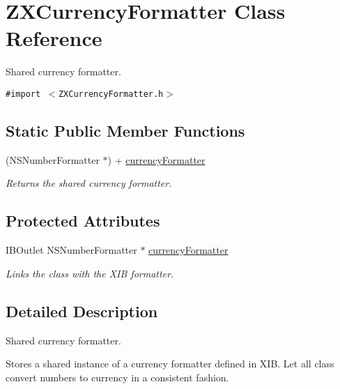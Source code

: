 \hypertarget{interface_z_x_currency_formatter}{
\section{ZXCurrencyFormatter Class Reference}
\label{interface_z_x_currency_formatter}
}
Shared currency formatter.  


{\tt \#import $<$ZXCurrencyFormatter.h$>$}

\subsection*{Static Public Member Functions}
\begin{CompactItemize}
\item 
\hypertarget{interface_z_x_currency_formatter_90aeca5beeb62fcac59b3ed1824b3fd6}{
(NSNumberFormatter $\ast$) + \hyperlink{interface_z_x_currency_formatter_90aeca5beeb62fcac59b3ed1824b3fd6}{currencyFormatter}}
\label{interface_z_x_currency_formatter_90aeca5beeb62fcac59b3ed1824b3fd6}

\begin{CompactList}\small\item\em Returns the shared currency formatter. \item\end{CompactList}\end{CompactItemize}
\subsection*{Protected Attributes}
\begin{CompactItemize}
\item 
IBOutlet NSNumberFormatter $\ast$ \hyperlink{interface_z_x_currency_formatter_d9a4bf6ab9a16ee88ea1aadf33ca02f5}{currencyFormatter}
\begin{CompactList}\small\item\em Links the class with the XIB formatter. \item\end{CompactList}\end{CompactItemize}


\subsection{Detailed Description}
Shared currency formatter. 

Stores a shared instance of a currency formatter defined in XIB. Let all class convert numbers to currency in a consistent fashion. 

